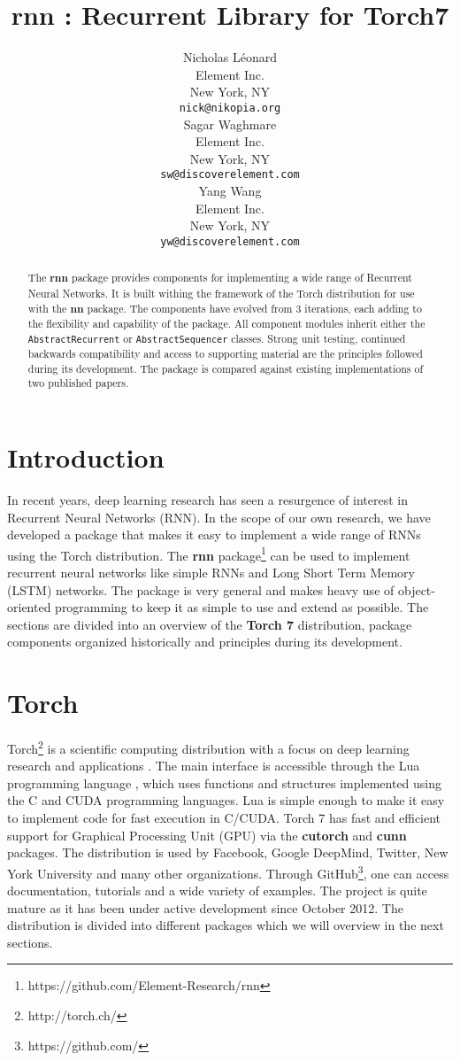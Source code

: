 \documentclass{article} %
\title{rnn : Recurrent Library for Torch7}
\author{
Nicholas L\'{e}onard \\
Element Inc.\\
New York, NY \\
\texttt{nick@nikopia.org} \\
\And
Sagar Waghmare \\
Element Inc.\\
New York, NY \\
\texttt{sw@discoverelement.com} \\
\And
Yang Wang \\
Element Inc.\\
New York, NY \\
\texttt{yw@discoverelement.com} \\
}
\providecommand{\inlinecode}[1]{\texttt{#1}}
\begin{document}
\maketitle

\begin{abstract}
The \textbf{rnn} package provides components for 
implementing a wide range of Recurrent Neural Networks.
It is built withing the framework of the Torch distribution
for use with the \textbf{nn} package.
The components have evolved from 3 iterations, each 
adding to the flexibility and capability of the package.
All component modules inherit either the \inlinecode{AbstractRecurrent}
or \inlinecode{AbstractSequencer} classes.
Strong unit testing, continued backwards compatibility and access to supporting material
are the principles followed during its development.
The package is compared against existing implementations of two published papers.
\end{abstract}

\section{Introduction}
In recent years, deep learning research has seen a resurgence of interest 
in Recurrent Neural Networks (RNN). In the scope of our own research, we
have developed a package that makes it easy to implement a wide range of RNNs using the 
Torch distribution. 
The \textbf{rnn} package\footnote{https://github.com/Element-Research/rnn} 
can be used to implement recurrent neural networks 
like simple RNNs and Long Short Term Memory (LSTM) networks.
The package is very general and makes heavy use 
of object-oriented programming to keep it as simple to use and extend as possible.
The sections are divided into an overview of the \textbf{Torch 7} distribution, 
package components organized historically and principles during its development.

\section{Torch}

Torch\footnote{http://torch.ch/} is a scientific computing distribution 
with a focus on deep learning research and applications \cite{collobert2011torch7}.
The main interface is accessible through the Lua programming language \cite{ierusalimschy1996lua},
which uses functions and structures implemented using the C and CUDA programming languages.
Lua is simple enough to make it easy to implement code for fast execution in C/CUDA. 
Torch 7 has fast and efficient support for Graphical Processing Unit (GPU)
via the \textbf{cutorch} and \textbf{cunn} packages. 
The distribution is used by Facebook, Google DeepMind, Twitter, New York University and 
many other organizations. Through GitHub\footnote{https://github.com/}, one can access documentation, tutorials and 
a wide variety of examples. The project is quite mature as it has been under active
development since October 2012. The distribution is divided into different packages 
which we will overview in the next sections.
\end{document}
